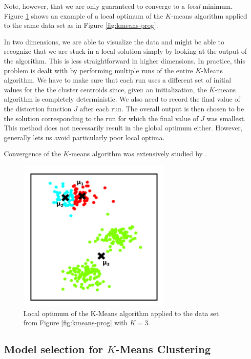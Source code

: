 \documentclass[final,3p,times,twocolumn]{elsarticle}
\begin{document}
Note, however, that we are only guaranteed to converge to a \emph{local} minimum.
Figure \ref{fig:kmeans-local} shows an example of a local optimum of the $K$-means algorithm applied to the same data set as in Figure \ref{fig:kmeans-prog}.

In two dimensions, we are able to visualize the data and might be able to recognize that we are stuck in a local solution simply by looking at the output of the algorithm. 
This is less straightforward in higher dimensions.
In practice, this problem is dealt with by performing multiple runs of the entire $K$-Means algorithm.
We have to make sure that each run uses a different set of initial values for the the cluster centroids since, given an initialization, the $K$-means algorithm is completely deterministic.
We also need to record the final value of the distortion function $J$ after each run.
The overall output is then chosen to be the solution corresponding to the run for which the final value of $J$ was smallest.
This method does not necessarily result in the global optimum either.
However, generally lets us avoid particularly poor local optima.

Convergence of the $K$-means algorithm was extensively studied by \cite{macqueen1967}.

\begin{figure}
\centering
\includegraphics[width=3in]{local.png}
\caption{Local optimum of the K-Means algorithm applied to the data set from Figure \ref{fig:kmeans-prog} with $K=3$.}
\label{fig:kmeans-local}
\end{figure}



\subsection{Model selection for $K$-Means Clustering}
\label{sect:kmeans-ms}
\end{document}
